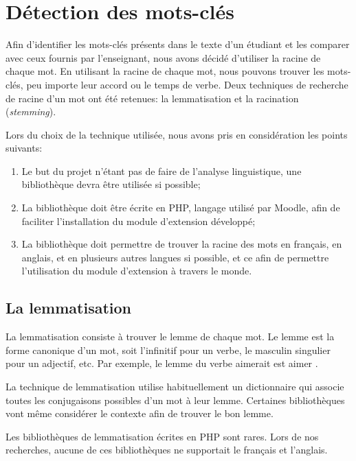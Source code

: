 \chapter{Détection des mots-clés}
\label{chap:keywords}

Afin d'identifier les mots-clés pr\'esents dans le texte d'un \'etudiant et les comparer avec ceux fournis par l'enseignant, nous avons décidé d'utiliser la racine de chaque mot.
En utilisant la racine de chaque mot, nous pouvons trouver les mots-clés, peu importe leur accord ou le temps de verbe.
Deux techniques de recherche de racine d'un mot ont été retenues: la lemmatisation et la racination (\textit{stemming}).

Lors du choix de la technique utilisée, nous avons pris en considération les points suivants:

\begin{enumerate}
  \item Le but du projet n'étant pas de faire de l'analyse linguistique, une biblioth\`eque devra être utilisée si possible;
  \item La biblioth\`eque doit être écrite en PHP, langage utilisé par Moodle, afin de faciliter l'installation du module d'extension développé;
  \item La biblioth\`eque doit permettre de trouver la racine des mots en français, en anglais, et en plusieurs autres langues si possible, et ce afin de permettre l'utilisation du module d'extension à travers le monde.
\end{enumerate}

\section{La lemmatisation}

La lemmatisation consiste à trouver le lemme de chaque mot.
Le lemme est la forme canonique d'un mot, soit l'infinitif pour un verbe, le masculin singulier pour un adjectif, etc.
Par exemple, le lemme du verbe \og aimerait \fg{} est \og aimer \fg{}.

La  technique de lemmatisation utilise habituellement un dictionnaire qui associe toutes les conjugaisons possibles d'un mot à leur lemme.
Certaines biblioth\`eques vont même considérer le contexte afin de trouver le bon lemme.

Les biblioth\`eques de lemmatisation écrites en PHP sont rares.
Lors de nos recherches, aucune de ces biblioth\`eques ne supportait le français et l'anglais.

